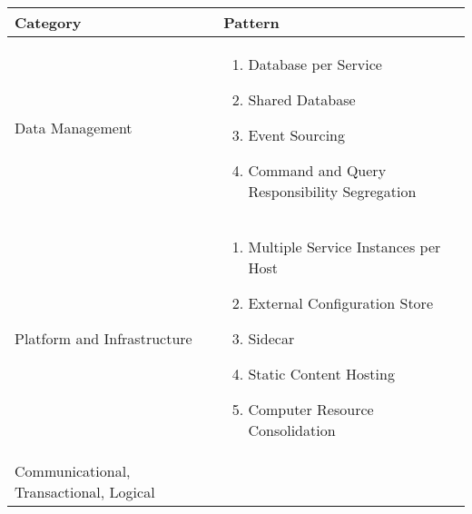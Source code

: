 \documentclass[conference]{IEEEtran}
\begin{document}
\begin{center}
    \begin{table}[h]
    \renewcommand*{\arraystretch}{1.8}
    \begin{tabular}{ | m{3cm} | m{12cm} | }

        \hline

        Category & Pattern
 
        \\

        \hline

        Data Management &  
        \vspace*{10px}
        
        \begin{enumerate}
            \item Database per Service
            \item Shared Database
            \item Event Sourcing
            \item Command and Query Responsibility Segregation
        \end{enumerate} 
 
        \\

        \hline

        Platform and Infrastructure & 

        \vspace*{10px}
        \begin{enumerate}
            \item Multiple Service Instances per Host
            \item External Configuration Store
            \item Sidecar
            \item Static Content Hosting
            \item Computer Resource Consolidation
        \end{enumerate} 
    
 
        \\

        \hline

        Communicational, Transactional, Logical & 
        

\end{tabular}
\end{table}
\end{center}
\end{document}
